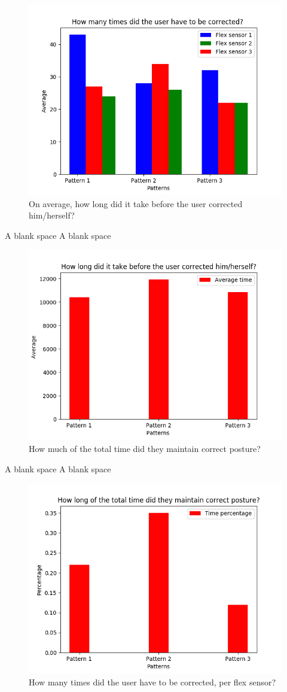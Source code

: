 \documentclass[sigconf]{acmart}
\begin{document}
\begin{figure}[h]
\centering
\includegraphics[width=0.8\columnwidth, scale=1]{p_q1.png}
\caption{On average, how long did it take before the user corrected him/herself?}
\end{figure}
{\color{white} A blank space } \linebreak
{\color{white} A blank space } \linebreak
\begin{figure}[hb]
\centering
\includegraphics[width=0.8\columnwidth, scale=1]{p_q2.png}
\caption{How much of the total time did they maintain correct posture?}
\end{figure}
{\color{white} A blank space } \linebreak
{\color{white} A blank space } \linebreak
\begin{figure}[h!]
\centering
\includegraphics[width=0.8\columnwidth, scale=1]{p_q3.png}
\caption{How many times did the user have to be corrected, per flex sensor?}
\end{figure} 
\end{document}
